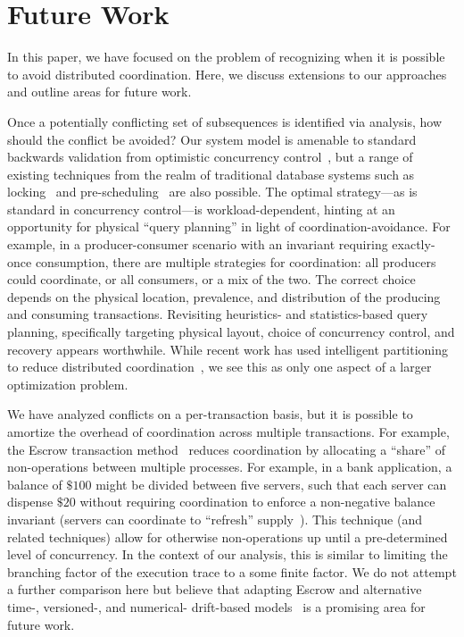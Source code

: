 
\section{Future Work}
\label{sec:discussion}

In this paper, we have focused on the problem of recognizing when it
is possible to avoid distributed coordination. Here, we discuss
extensions to our approaches and outline areas for future work.

 Once a potentially conflicting set of
subsequences is identified via \iconfluence analysis, how should the
conflict be avoided? Our system model is amenable to standard
backwards validation from optimistic concurrency
control~\cite{bernstein-book}, but a range of existing techniques from
the realm of traditional database systems such as
locking~\cite{gray-virtues} and pre-scheduling~\cite{calvin} are also
possible. The optimal strategy---as is standard in concurrency
control---is workload-dependent, hinting at an opportunity for
physical ``query planning'' in light of coordination-avoidance. For
example, in a producer-consumer scenario with an invariant requiring
exactly-once consumption, there are multiple strategies for
coordination: all producers could coordinate, or all consumers, or a
mix of the two. The correct choice depends on the physical location,
prevalence, and distribution of the producing and consuming
transactions. Revisiting heuristics- and statistics-based query
planning, specifically targeting physical layout, choice of
concurrency control, and recovery appears worthwhile. While recent
work has used intelligent partitioning to reduce distributed
coordination~\cite{schism}, we see this as only one aspect of a larger
optimization problem.

 We have analyzed conflicts on a
per-transaction basis, but it is possible to amortize the overhead of
coordination across multiple transactions. For example, the Escrow
transaction method~\cite{escrow} reduces coordination by allocating a
``share'' of non-\iconfluent operations between multiple
processes. For example, in a bank application, a balance of $\$100$
might be divided between five servers, such that each server can
dispense $\$20$ without requiring coordination to enforce a
non-negative balance invariant (servers can coordinate to ``refresh''
supply~\cite{mdcc}). This technique (and related techniques) allow
\cfreedom for otherwise non-\iconfluent operations up until a
pre-determined level of concurrency. In the context of our \cfreedom
analysis, this is similar to limiting the branching factor of the
execution trace to a some finite factor. We do not attempt a further
comparison here but believe that adapting Escrow and alternative
time-, versioned-, and numerical- drift-based models~\cite{yu-conit}
is a promising area for future work.

